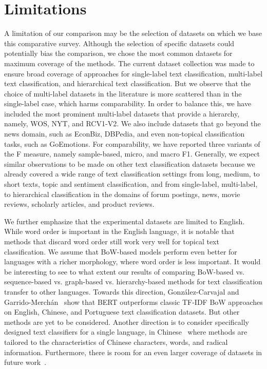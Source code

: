 \documentclass[lettersize,journal]{IEEEtran}
\begin{document}
\section{Limitations}\label{sec:limitations}

A limitation of our comparison may be the selection of datasets on which we base this comparative survey. 
Although the selection of specific datasets could potentially bias the comparison, we chose the most common datasets for maximum coverage of the methods.
The current dataset collection was made to ensure broad coverage of approaches for single-label text classification, multi-label text classification, and hierarchical text classification. 
But we observe that the choice of multi-label datasets in the literature is more scattered than in the single-label case, which harms comparability. 
In order to balance this, we have included the most prominent multi-label datasets that provide a hierarchy, namely, WOS, NYT, and RCV1-V2.
We also include datasets that go beyond the news domain, such as EconBiz, DBPedia, and even non-topical classification tasks, such as GoEmotions. 
For comparability, we have reported three variants of the F measure, namely sample-based, micro, and macro F1.
Generally, we expect similar observations to be made on other text classification datasets because we already covered a wide range of text classification settings from long, medium, to short texts, topic and sentiment classification, and from single-label, multi-label, to hierarchical classification in the domains of forum postings, news, movie reviews, scholarly articles, and product reviews. 

We further emphasize that the experimental datasets are limited to English.
While word order is important in the English language, 
it is notable that methods that discard word order still work very well for topical text classification.
We assume that BoW-based models perform even better for languages with a richer morphology, where word order is less important.
It would be interesting to see to what extent our results of comparing BoW-based vs. sequence-based vs. graph-based vs. hierarchy-based methods for text classification transfer to other languages.
Towards this direction, Gonz\'{a}lez-Carvajal and Garrido-Merch\'{a}n~\cite{gonzales-2020-comparing-bert} show that BERT outperforms classic TF-IDF BoW approaches on English, Chinese, and Portuguese text classification datasets.
But other methods are yet to be considered.
Another direction is to consider specifically designed text classifiers for a single language, \eg in Chinese~\cite{9837023-chinese} where methods are tailored to the characteristics of Chinese characters, words, and radical information.
Furthermore, there is room for an even larger coverage of datasets in future work~\cite{Bhatia16}. 
\end{document}
